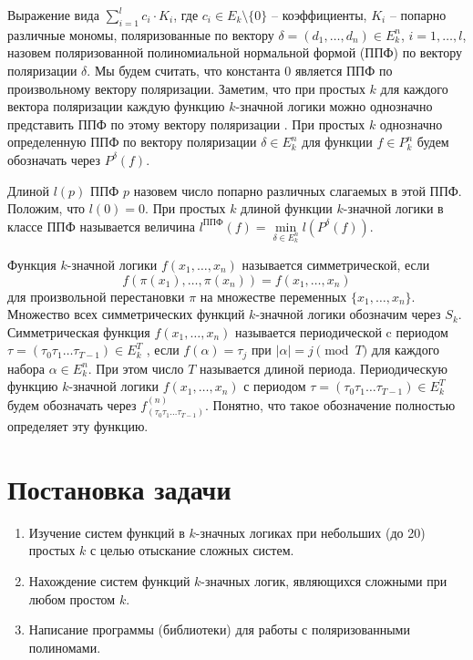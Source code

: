 \documentclass[bibliography=totoc, a4paper, 12pt]{extarticle}
\let\stdsection\section
\renewcommand\section{\newpage\stdsection}
\begin{document}
Выражение вида $\sum\limits_{i=1}^lc_i \cdot K_i$, где $c_i \in
E_k\setminus\{0\}$ -- коэффициенты, $K_i$ -- попарно различные мономы,
поляризованные по вектору $\delta = (d_1, \dots, d_n) \in E_k^n$, $i = 1, \dots,
l$, назовем поляризованной полиномиальной нормальной формой (ППФ) по вектору
поляризации $\delta$. Мы будем считать, что константа 0 является ППФ по
произвольному вектору поляризации. Заметим, что при простых $k$ для каждого
вектора поляризации каждую функцию $k$\nobreakdash-значной логики можно
однозначно представить ППФ по этому вектору поляризации \cite{ss02}. При простых
$k$ однозначно определенную ППФ по вектору поляризации $\delta \in E_k^n$ для
функции $f \in P_k^n$ будем обозначать через $P^{\delta}(f)$.

Длиной $l(p)$ ППФ $p$ назовем число попарно различных слагаемых в этой ППФ.
Положим, что $l(0) = 0$. При простых $k$ длиной функции $k$\nobreakdash-значной
логики в классе ППФ называется величина $l^{\text{ППФ}}(f) = \min\limits_{\delta
\in E_k^n}l(P^{\delta}(f))$.

Функция $k$\nobreakdash-значной логики $f(x_1 ,\dots , x_n)$ называется
симметрической, если $$f(\pi(x_1), \dots, \pi(x_n)) = f(x_1, \dots, x_n)$$ для
произвольной перестановки $\pi$ на множестве переменных $\{x_1 , \dots , x_n \}$.
Множество всех симметрических функций $k$\nobreakdash-значной логики обозначим
через $S_k$. Симметрическая функция $f(x_1, \dots, x_n)$ называется
периодической c периодом $\tau = (\tau_0 \tau_1 \dots \tau_{T-1}) \in E_k^T$ ,
если $f(\alpha) = \tau_j$ при $|\alpha| = j \pmod T$ для каждого набора $\alpha
\in E_k^n$. При этом число $T$ называется длиной периода. Периодическую функцию
$k$\nobreakdash-значной логики $f(x_1 , \dots , x_n)$ с периодом $\tau = (\tau_0
\tau_1 \dots \tau_{T-1}) \in E_k^T$ будем обозначать через $f^{(n)}_{(\tau_0
\tau_1 \dots \tau_{T-1})}$. Понятно, что такое обозначение полностью определяет
эту функцию.

\section{Постановка задачи}
\begin{enumerate}
\item Изучение систем функций в $k$-значных логиках при небольших (до 20)
простых $k$ с целью отыскание сложных систем.

\item Нахождение систем функций $k$-значных логик, являющихся сложными при любом
простом $k$.

\item Написание программы (библиотеки) для работы с поляризованными полиномами.
\end{enumerate}
\end{document}
